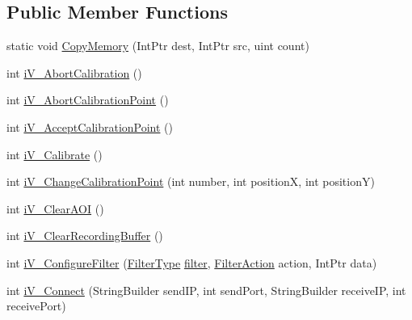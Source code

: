 \subsection*{Public Member Functions}
\begin{DoxyCompactItemize}
\item 
static void \hyperlink{class_web_analyzer_1_1_eye_tracking_1_1_eye_tracking_controller_ad45cea6f5c18fa275cbb01b0401480de}{Copy\+Memory} (Int\+Ptr dest, Int\+Ptr src, uint count)
\item 
int \hyperlink{class_web_analyzer_1_1_eye_tracking_1_1_eye_tracking_controller_afe1ed106a76e89624985ce65488f5406}{i\+V\+\_\+\+Abort\+Calibration} ()
\item 
int \hyperlink{class_web_analyzer_1_1_eye_tracking_1_1_eye_tracking_controller_a87550879331364504c119562cb715e86}{i\+V\+\_\+\+Abort\+Calibration\+Point} ()
\item 
int \hyperlink{class_web_analyzer_1_1_eye_tracking_1_1_eye_tracking_controller_a16aa32e9c39e0a25ed42861ad9b100bd}{i\+V\+\_\+\+Accept\+Calibration\+Point} ()
\item 
int \hyperlink{class_web_analyzer_1_1_eye_tracking_1_1_eye_tracking_controller_a56b96b62dfc65f984477f7acd2e4fe13}{i\+V\+\_\+\+Calibrate} ()
\item 
int \hyperlink{class_web_analyzer_1_1_eye_tracking_1_1_eye_tracking_controller_a43f17db60a0e4b65092880d9452199f8}{i\+V\+\_\+\+Change\+Calibration\+Point} (int number, int position\+X, int position\+Y)
\item 
int \hyperlink{class_web_analyzer_1_1_eye_tracking_1_1_eye_tracking_controller_af5b3d871257fa54cd55db04e80839592}{i\+V\+\_\+\+Clear\+A\+O\+I} ()
\item 
int \hyperlink{class_web_analyzer_1_1_eye_tracking_1_1_eye_tracking_controller_a9aa939927f5998f02a2fa7e37a01cefd}{i\+V\+\_\+\+Clear\+Recording\+Buffer} ()
\item 
int \hyperlink{class_web_analyzer_1_1_eye_tracking_1_1_eye_tracking_controller_a8f42cf34bedd31c2bd18aff7202fb8f4}{i\+V\+\_\+\+Configure\+Filter} (\hyperlink{class_web_analyzer_1_1_eye_tracking_1_1_eye_tracking_controller_ad9753f580da53bc6d88c2e32a579a2cc}{Filter\+Type} \hyperlink{_u_i_2_h_t_m_l_resources_2js_2src_2filter_8js_ae38c2617ed257be293e0db9df0f8456a}{filter}, \hyperlink{class_web_analyzer_1_1_eye_tracking_1_1_eye_tracking_controller_abb07906895fb0b4d42dda920e7e9bc1e}{Filter\+Action} action, Int\+Ptr data)
\item 
int \hyperlink{class_web_analyzer_1_1_eye_tracking_1_1_eye_tracking_controller_af260b9bc9e30b804be82aa597f4013fb}{i\+V\+\_\+\+Connect} (String\+Builder send\+I\+P, int send\+Port, String\+Builder receive\+I\+P, int receive\+Port)

\end{DoxyCompactItemize}
